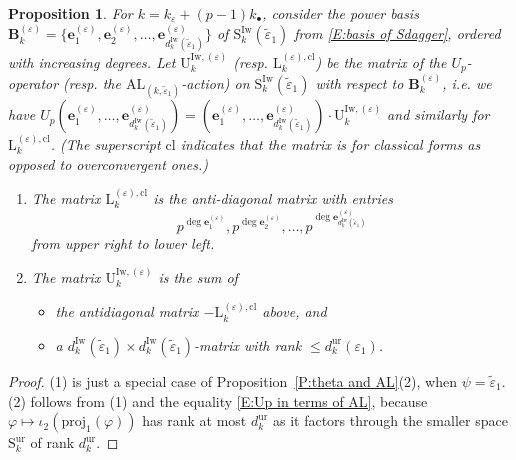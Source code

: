 \documentclass[12pt]{amsart}
\newtheorem{proposition}[subsection]{Proposition}
\theoremstyle{definition}
\numberwithin{equation}{subsection}
\def\bfB{\mathbf{B}}
\def\bfe{\mathbf{e}}
\def\rmL{\mathrm{L}}
\def\rmU{\mathrm{U}}
\def\rmS{\mathrm{S}}
\newcommand{\proj}{\mathrm{proj}}
\newcommand{\AL}{\mathrm{AL}}
\newcommand{\Iw}{\mathrm{Iw}}
\newcommand{\cl}{\mathrm{cl}}
\newcommand{\ur}{\mathrm{ur}}
\begin{document}
\begin{proposition}
\label{P:oldform basis}
For ${k} = k_\varepsilon + (p-1)k_{\bullet}$, consider the power basis  $\bfB^{(\varepsilon)}_k = \{\bfe_1^{(\varepsilon)},  \bfe_2^{(\varepsilon)}, \dots,\bfe_{d_k^\Iw(\tilde \varepsilon_1) }^{(\varepsilon)}\}$ of $\rmS_k^\Iw(\tilde \varepsilon_1)$ from \eqref{E:basis of Sdagger}, ordered with increasing degrees. Let $\rmU_k^{\Iw,(\varepsilon)}$ (resp. $\rmL_k^{(\varepsilon),\cl}$) be the matrix of the $U_p$-operator (resp. the $\AL_{(k, \tilde \varepsilon_1)}$-action) on $\rmS_k^\Iw(\tilde \varepsilon_1)$ with respect to $\bfB^{(\varepsilon)}_k$, i.e. we have $U_p(\bfe_1^{(\varepsilon)},\dots, \bfe_{d_k^\Iw(\tilde \varepsilon_1) }^{(\varepsilon)})=(\bfe_1^{(\varepsilon)},\dots, \bfe_{d_k^\Iw(\tilde \varepsilon_1) }^{(\varepsilon)})\cdot \rmU_k^{\Iw,(\varepsilon)}$ and similarly for $\rmL_k^{(\varepsilon),\cl}$. (The superscript $\mathrm{cl}$ indicates that the matrix is for classical forms as opposed to overconvergent ones.)

\begin{enumerate}
\item The matrix $\rmL_k^{(\varepsilon),\cl}$  is the \emph{anti-diagonal} matrix with entries 
$$
p^{\deg \bfe_1^{(\varepsilon)}}, p^{\deg \bfe_2^{(\varepsilon)}}, \dots, p^{\deg \bfe_{d_k^\Iw(\tilde \varepsilon_1)}^{(\varepsilon)}}
$$
from upper right to lower left. 

\item
The matrix $\rmU_k^{\Iw,(\varepsilon)}$ is the sum of 
\begin{itemize}
\item the antidiagonal matrix $-\rmL_k^{(\varepsilon),\cl}$ above, and
\item a $d_k^\Iw(\tilde \varepsilon_1) \times d_k^\Iw(\tilde \varepsilon_1) $-matrix with rank $\leq d_k^\ur(\varepsilon_1)$.
\end{itemize}  

\end{enumerate}

\end{proposition}


\begin{proof}
(1) is just a special case of Proposition~\ref{P:theta and AL}(2), when $\psi = \tilde \varepsilon_1$.  (2) follows from (1) and the equality \eqref{E:Up in terms of AL}, because $\varphi \mapsto \iota_2(\proj_1(\varphi))$ has rank at most $d_k^\ur$ as it factors through the smaller space $\rmS_k^\ur$ of rank $d_k^\ur$.
\end{proof}
\end{document}
